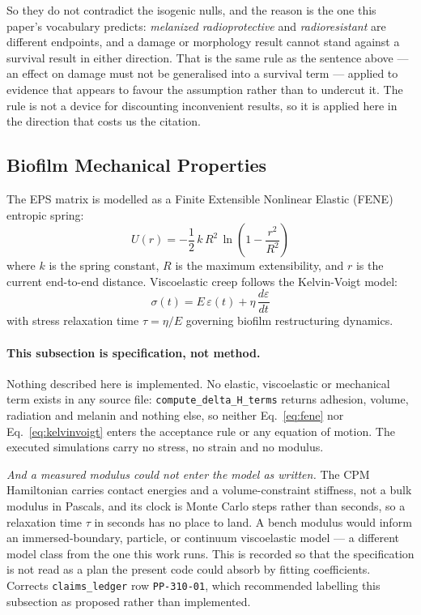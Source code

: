 \documentclass[11pt]{article}
\begin{document}
So they do not contradict the isogenic nulls, and the reason is the one this paper's
vocabulary predicts: \emph{melanized radioprotective} and \emph{radioresistant} are
different endpoints, and a damage or morphology result cannot stand against a survival
result in either direction. That is the same rule as the sentence above --- an effect on
damage must not be generalised into a survival term --- applied to evidence that appears to
favour the assumption rather than to undercut it. The rule is not a device for discounting
inconvenient results, so it is applied here in the direction that costs us the citation.

\subsection{Biofilm Mechanical Properties}
\label{app:mechanics}

The EPS matrix is modelled as a Finite Extensible Nonlinear Elastic (FENE) entropic spring:
\begin{equation}
\label{eq:fene}
U(r) = -\frac{1}{2}\,k\,R^2\,\ln\!\left(1 - \frac{r^2}{R^2}\right)
\end{equation}
where $k$ is the spring constant, $R$ is the maximum extensibility, and $r$ is the current
end-to-end distance.  Viscoelastic creep follows the Kelvin-Voigt model:
\begin{equation}
\label{eq:kelvinvoigt}
\sigma(t) = E\,\varepsilon(t) + \eta\,\frac{d\varepsilon}{dt}
\end{equation}
with stress relaxation time $\tau = \eta/E$ governing biofilm restructuring dynamics.

\paragraph{This subsection is specification, not method.} Nothing described here is
implemented. No elastic, viscoelastic or mechanical term exists in any source file:
\texttt{compute\_delta\_H\_terms} returns adhesion, volume, radiation and melanin and
nothing else, so neither Eq.~\ref{eq:fene} nor Eq.~\ref{eq:kelvinvoigt} enters the
acceptance rule or any equation of motion. The executed simulations carry no stress, no
strain and no modulus.

\emph{And a measured modulus could not enter the model as written.} The CPM Hamiltonian
carries contact energies and a volume-constraint stiffness, not a bulk modulus in Pascals,
and its clock is Monte Carlo steps rather than seconds, so a relaxation time $\tau$ in
seconds has no place to land. A bench modulus would inform an immersed-boundary, particle,
or continuum viscoelastic model --- a different model class from the one this work runs.
This is recorded so that the specification is not read as a plan the present code could
absorb by fitting coefficients. Corrects \texttt{claims\_ledger} row \texttt{PP-310-01},
which recommended labelling this subsection as proposed rather than implemented.
\end{document}
